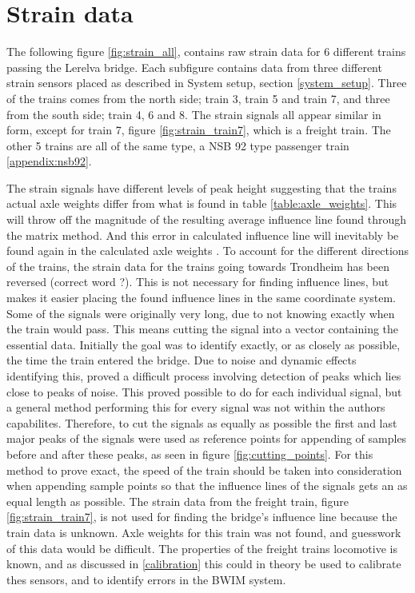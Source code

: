 \section{Strain data}
The following figure \ref{fig:strain_all}, contains raw strain data for 6 different trains passing the Lerelva bridge. Each subfigure contains data from three different strain sensors placed as described in System setup, section \ref{system_setup}. Three of the trains comes from the north side; train 3, train 5 and train 7, and three from the south side; train 4, 6 and 8. The strain signals all appear similar in form, except for train 7, figure \ref{fig:strain_train7}, which is a freight train. The other 5 trains are all of the same type, a NSB 92 type passenger train \ref{appendix:nsb92}.

The strain signals have different levels of peak height suggesting that the trains actual axle weights differ from what is found in table \ref{table:axle_weights}. This will throw off the magnitude of the resulting average influence line found through the matrix method. And this error in calculated influence line will inevitably be found again in the calculated axle weights \label{peaks_heights}.
To account for the different directions of the trains, the strain data for the trains going towards Trondheim has been reversed (correct word ?). This is not necessary for finding influence lines, but makes it easier placing the found influence lines in the same coordinate system.
Some of the signals were originally very long, due to not knowing exactly when the train would pass. This means cutting the signal into a vector containing the essential data. Initially the goal was to identify exactly, or as closely as possible, the time the train entered the bridge. Due to noise and dynamic effects identifying this, proved a difficult process involving detection of peaks which lies close to peaks of noise. This proved possible to do for each individual signal, but a general method performing this for every signal was not within the authors capabilites. Therefore, to cut the signals as equally as possible the first and last major peaks of the signals were used as reference points for appending of samples before and after these peaks, as seen in figure \ref{fig:cutting_points}. For this method to prove exact, the speed of the train should be taken into consideration when appending sample points so that the influence lines of the signals gets an as equal length as possible.
The strain data from the freight train, figure \ref{fig:strain_train7}, is not used for finding the bridge's influence line because the train data is unknown. Axle weights for this train was not found, and guesswork of this data would be difficult. The properties of the freight trains locomotive is known, and as discussed in \ref{calibration} this could in theory be used to calibrate thes sensors, and to identify errors in the BWIM system.

